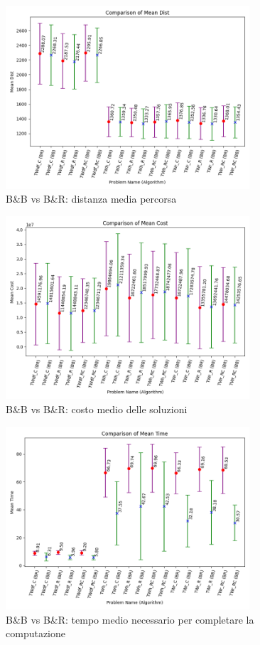\documentclass[
    article,            %
    12pt,                %
    oneside,            %
    a4paper,            %
    english,            %
    italian,                %
    sumario=tradicional,
]{abntex2}
\begin{document}
\newpage{}
\vspace*{\fill}
\begin{figure}[h!]
    \centering
    \includegraphics[width=0.81\textwidth]{Images/mean_dist.png}
    \caption{B\&B vs B\&R: distanza media percorsa}
    \label{fig:Mean_dist}
\end{figure}
\begin{figure}[h!]
    \centering
    \includegraphics[width=0.81\textwidth]{Images/mean_cost.png}
    \caption{B\&B vs B\&R: costo medio delle soluzioni}
    \label{fig:Mean_cost}
\end{figure}
\vspace*{\fill}

\newpage{}
\begin{figure}[h!]
    \centering
    \includegraphics[width=0.81\textwidth]{Images/mean_time.png}
    \caption{B\&B vs B\&R: tempo medio necessario per completare la computazione}
    \label{fig:mean_time}
\end{figure}

\vspace{1.5cm}
\printbibliography[title=Bibliografia]
\end{document}
